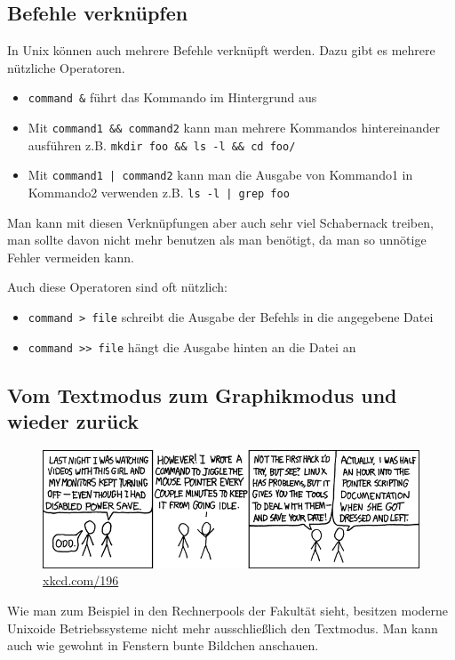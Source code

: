 \subsection{Befehle verknüpfen}
In Unix können auch mehrere Befehle verknüpft werden. Dazu gibt es mehrere nützliche Operatoren.
\begin{itemize}
\item \lstinline$command &$ führt das Kommando im Hintergrund aus
\item Mit \lstinline$command1 && command2$ kann man mehrere Kommandos hintereinander ausführen z.B. \lstinline$mkdir foo && ls -l && cd foo/$
\item Mit \lstinline$command1 | command2$ kann man die Ausgabe von Kommando1 in Kommando2 verwenden  z.B. \lstinline$ls -l | grep foo$
\end{itemize}

Man kann mit diesen Verknüpfungen aber auch sehr viel Schabernack treiben, man sollte davon nicht mehr benutzen als man benötigt, da man so unnötige Fehler vermeiden kann.

Auch diese Operatoren sind oft nützlich:
\begin{itemize}
\item \lstinline$command > file$ schreibt die Ausgabe der Befehls in die angegebene Datei
\item \lstinline$command >> file$ hängt die Ausgabe hinten an die Datei an
\end{itemize}


\subsection{Vom Textmodus zum Graphikmodus und wieder zurück}
\begin{figure}
	\centering
	\includegraphics[width=\textwidth]{images/command_line_fu.png}
	\caption{\href{http://xkcd.com/196}{xkcd.com/196}}
\end{figure}
Wie man zum Beispiel in den Rechnerpools der Fakultät sieht, besitzen moderne Unixoide Betriebssysteme nicht mehr ausschließlich den Textmodus. Man kann auch wie gewohnt in Fenstern bunte Bildchen anschauen.

